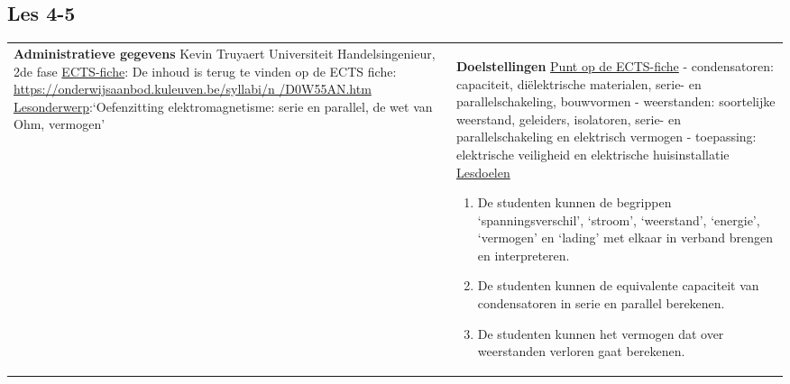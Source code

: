 


\begin{landscape}
	
	\subsection{Les 4-5}
	\begin{tabularx}{1.56\textwidth}{|p{}|X|}\hline
		\textbf{Administratieve gegevens}\newline\newline
		Kevin Truyaert\newline\newline
		Universiteit\newline
		Handelsingenieur, 2de fase\newline
		\underline{ECTS-fiche}: De inhoud is terug te vinden op de ECTS fiche: \href{https://onderwijsaanbod.kuleuven.be/syllabi/n/D0W55AN.htm}{https://onderwijsaanbod.kuleuven.be/syllabi/n /D0W55AN.htm} \newline
		\underline{Lesonderwerp}:\newline `Oefenzitting elektromagnetisme: serie en parallel, de wet van Ohm, vermogen' & \textbf{Doelstellingen}\newline\vspace{0.5cm}
		\underline{Punt op de ECTS-fiche}
		\vspace{-0.5cm}\newline  - condensatoren: capaciteit, diëlektrische materialen, serie- en parallelschakeling, bouwvormen \newline
		- weerstanden: soortelijke weerstand, geleiders, isolatoren, serie- en parallelschakeling en elektrisch vermogen\newline
		- toepassing: elektrische veiligheid en elektrische huisinstallatie \newline
		\underline{Lesdoelen}\newline
		\vspace{-0.5cm}
		\begin{enumerate}[itemsep=0.08\baselineskip]
			\item De studenten kunnen de begrippen `spanningsverschil', `stroom', `weerstand', `energie', `vermogen' en `lading' met elkaar in verband brengen en interpreteren.
			\item De studenten kunnen de equivalente capaciteit van condensatoren in serie en parallel berekenen.
			\item De studenten kunnen het vermogen dat over weerstanden verloren gaat berekenen.

\end{enumerate}
\end{tabularx}
\end{landscape}
